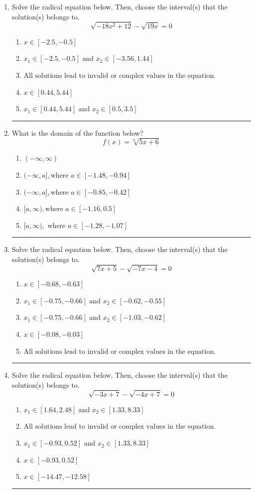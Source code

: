 \documentclass[14pt]{extbook}
\newcommand{\litem}[1]{\item#1\hspace*{-1cm}\rule{\textwidth}{0.4pt}}
\begin{document}
\begin{enumerate}
\litem{
Solve the radical equation below. Then, choose the interval(s) that the solution(s) belongs to.\[ \sqrt{-18 x^2 + 12} - \sqrt{19 x} = 0 \]\begin{enumerate}[label=\Alph*.]
\item \( x \in [-2.5,-0.5] \)
\item \( x_1 \in [-2.5, -0.5] \text{ and } x_2 \in [-3.56,1.44] \)
\item \( \text{All solutions lead to invalid or complex values in the equation.} \)
\item \( x \in [0.44,5.44] \)
\item \( x_1 \in [0.44, 5.44] \text{ and } x_2 \in [0.5,3.5] \)

\end{enumerate} }
\litem{
What is the domain of the function below?\[ f(x) = \sqrt[6]{5 x + 6} \]\begin{enumerate}[label=\Alph*.]
\item \( (-\infty, \infty) \)
\item \( (-\infty, a], \text{where } a \in [-1.48, -0.94] \)
\item \( (-\infty, a], \text{where } a \in [-0.85, -0.42] \)
\item \( [a, \infty), \text{where } a \in [-1.16, 0.5] \)
\item \( [a, \infty), \text{ where } a \in [-1.28, -1.07] \)

\end{enumerate} }
\litem{
Solve the radical equation below. Then, choose the interval(s) that the solution(s) belongs to.\[ \sqrt{7 x + 5} - \sqrt{-7 x - 4} = 0 \]\begin{enumerate}[label=\Alph*.]
\item \( x \in [-0.68,-0.63] \)
\item \( x_1 \in [-0.75, -0.66] \text{ and } x_2 \in [-0.62,-0.55] \)
\item \( x_1 \in [-0.75, -0.66] \text{ and } x_2 \in [-1.03,-0.62] \)
\item \( x \in [-0.08,-0.03] \)
\item \( \text{All solutions lead to invalid or complex values in the equation.} \)

\end{enumerate} }
\litem{
Solve the radical equation below. Then, choose the interval(s) that the solution(s) belongs to.\[ \sqrt{-3 x + 7} - \sqrt{-4 x + 7} = 0 \]\begin{enumerate}[label=\Alph*.]
\item \( x_1 \in [1.64, 2.48] \text{ and } x_2 \in [1.33,8.33] \)
\item \( \text{All solutions lead to invalid or complex values in the equation.} \)
\item \( x_1 \in [-0.93, 0.52] \text{ and } x_2 \in [1.33,8.33] \)
\item \( x \in [-0.93,0.52] \)
\item \( x \in [-14.47,-12.58] \)


\end{enumerate}}
\end{enumerate}
\end{document}
